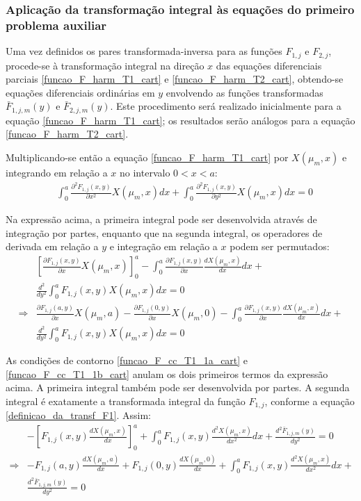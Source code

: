 \subsubsection{Aplicação da transformação integral às equações do primeiro problema auxiliar}\label{secao_reciprocidade_F}

Uma vez definidos os pares transformada-inversa para as funções $F_{1,j}$ e $F_{2,j}$, procede-se à transformação integral na direção $x$ das equações
diferenciais parciais \eqref{funcao_F_harm_T1_cart} e \eqref{funcao_F_harm_T2_cart}, obtendo-se equações diferenciais ordinárias em $y$ envolvendo
as funções transformadas $\bar{F}_{1,j,m}(y)$ e $\bar{F}_{2,j,m}(y)$. Este procedimento será realizado inicialmente para a equação \eqref{funcao_F_harm_T1_cart};
os resultados serão análogos para a equação \eqref{funcao_F_harm_T2_cart}.

Multiplicando-se então a equação \eqref{funcao_F_harm_T1_cart} por $X(\mu_m, x)$ e integrando em relação a $x$ no intervalo $0 < x < a$: 
\begin{align}
& \int_0^a  \frac{\partial^2 F_{1,j}(x, y)}{\partial x^2}X(\mu_m, x)dx + \int_0^a \frac{\partial^2 F_{1,j}(x, y)}{\partial y^2}X(\mu_m, x)dx = 0 
\end{align}

Na expressão acima, a primeira integral pode ser desenvolvida através de integração por partes, enquanto que na segunda integral, os operadores de derivada
em relação a $y$ e integração em relação a $x$ podem ser permutados:
\begin{align}
& \left[ \frac{\partial F_{1,j}(x, y)}{\partial x}X(\mu_m, x) \right]_0^a
-
\int_0^a  \frac{\partial F_{1,j}(x, y)}{\partial x}\frac{dX(\mu_m, x)}{dx} dx + \nonumber \\
& \frac{d^2}{d y^2}\int_0^a F_{1,j}(x, y)X(\mu_m, x)dx = 0 \nonumber \\ 
\Rightarrow & \frac{\partial F_{1,j}(a, y)}{\partial x}X(\mu_m, a) - \frac{\partial F_{1,j}(0, y)}{\partial x}X(\mu_m, 0)
-
\int_0^a  \frac{\partial F_{1,j}(x, y)}{\partial x}\frac{dX(\mu_m, x)}{dx} dx + \nonumber \\
& \frac{d^2}{d y^2}\int_0^a F_{1,j}(x, y)X(\mu_m, x)dx = 0
\end{align}

As condições de contorno \eqref{funcao_F_cc_T1_1a_cart} e \eqref{funcao_F_cc_T1_1b_cart} anulam os dois primeiros termos da expressão acima. A primeira
integral também pode ser desenvolvida por partes. A segunda integral é exatamente a transformada integral da função $F_{1, j}$, conforme a equação \eqref{definicao_da_transf_F1}.
Assim:
\begin{align}
&
- \left[ F_{1,j}(x, y)\frac{dX(\mu_m, x)}{dx} \right]_0^a
+ \int_0^a  F_{1,j}(x, y)\frac{d^2X(\mu_m, x)}{dx^2} dx + \frac{d^2 \bar{F}_{1,j,m}(y)}{d y^2} = 0 \nonumber \\
\Rightarrow &
- F_{1,j}(a, y)\frac{dX(\mu_m, a)}{dx}+ F_{1,j}(0, y)\frac{dX(\mu_m, 0)}{dx} + \int_0^a  F_{1,j}(x, y)\frac{d^2X(\mu_m, x)}{dx^2} dx + \nonumber \\
& \frac{d^2 \bar{F}_{1,j,m}(y)}{d y^2} = 0
\end{align}

